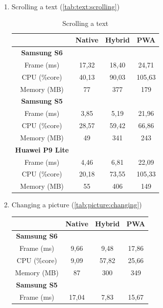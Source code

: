 \documentclass{kththesis}
\begin{document}
\begin{enumerate} [ref={Scenario}\xspace\arabic*]
    \item \label{scenario:text:scrolling} Scrolling a text (\autoref{tab:text:scrolling})
    \begin{table}[]
        \centering
        \begin{tabular}{|c|c|c|c|}
            \hline
             & Native & Hybrid & PWA \\
             \hline
            \textbf{Samsung S6} &   &   &   \\
            Frame (ms) & 17,32 & 18,40 & 24,71 \\
            CPU (\%core) & 40,13 & 90,03 & 105,63 \\
            Memory (MB) & 77 & 377 & 179 \\
            \hline   
            \textbf{Samsung S5} &   &   &   \\
            Frame (ms) & 3,85 & 5,19 & 21,96 \\
            CPU (\%core) & 28,57 & 59,42 & 66,86 \\
            Memory (MB) & 49 & 341 & 243 \\
            \hline
            \textbf{Huawei P9 Lite} &   &   &   \\
            Frame (ms) & 4,46 & 6,81 & 22,09 \\
            CPU (\%core) & 20,18 & 73,55 & 105,33 \\
            Memory (MB) & 55 & 406 & 149 \\
            \hline
        \end{tabular}
        \caption{Scrolling a text}
        \label{tab:text:scrolling}
    \end{table}
    \item \label{scenario:picture:changing} Changing a picture (\autoref{tab:picture:changing})
    \begin{table}[]
        \centering
        \begin{tabular}{|c|c|c|c|}
            \hline
             & Native & Hybrid & PWA \\
             \hline
            \textbf{Samsung S6} &   &   &   \\
            Frame (ms) & 9,66 & 9,48 & 17,86 \\
            CPU (\%core) & 9,09 & 57,82 & 25,66 \\
            Memory (MB) & 87 & 300 & 349 \\
            \hline   
            \textbf{Samsung S5} &   &   &   \\
            Frame (ms) & 17,04 & 7,83 & 15,67 \\

\end{tabular}
\end{table}
\end{enumerate}
\end{document}
